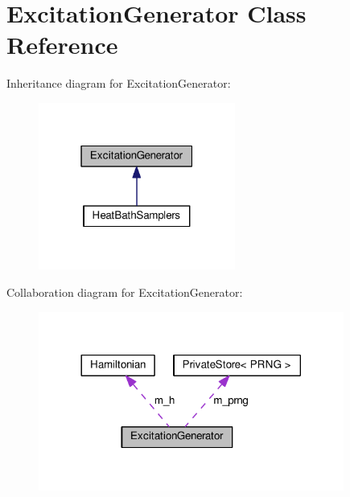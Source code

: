 \hypertarget{classExcitationGenerator}{}\section{Excitation\+Generator Class Reference}
\label{classExcitationGenerator}


Inheritance diagram for Excitation\+Generator\+:\nopagebreak
\begin{figure}[H]
\begin{center}
\leavevmode
\includegraphics[width=183pt]{classExcitationGenerator__inherit__graph}
\end{center}
\end{figure}


Collaboration diagram for Excitation\+Generator\+:\nopagebreak
\begin{figure}[H]
\begin{center}
\leavevmode
\includegraphics[width=284pt]{classExcitationGenerator__coll__graph}
\end{center}
\end{figure}
